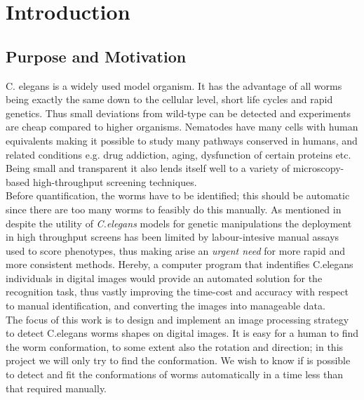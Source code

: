 \cleardoublepage
\thispagestyle{empty}
\chapter{Introduction}

\section{Purpose and Motivation}
\label{sec:motivation}


C. elegans is a widely used model organism. It has the advantage of all worms 
being exactly the same down to the cellular level, short life cycles and rapid
 genetics. Thus small deviations from wild-type can be detected and experiments
 are cheap compared to higher organisms. Nematodes have many cells with human
 equivalents making it possible to study many pathways conserved in humans, 
and related conditions e.g. drug addiction, aging, dysfunction of certain
 proteins etc. Being small and transparent it also lends itself well to a 
variety of microscopy-based high-throughput screening techniques.\\
 
Before quantification, the worms have to be identified; this should be 
automatic since there are too many worms to feasibly do this manually.
As mentioned in 
\cite{automated} despite the utility of \emph{C.elegans} models for genetic 
manipulations the deployment in high throughput screens has been limited by 
labour-intesive manual assays used to score phenotypes, thus making arise
an \emph{urgent need} for more rapid and more consistent methods.
Hereby, a computer
program that indentifies C.elegans individuals in digital images would 
provide an automated solution for the recognition task, thus vastly 
improving the time-cost and accuracy with respect to manual identification, 
and converting the images into manageable data.\\

The focus of this work is to design and implement an image processing
strategy to detect C.elegans worms shapes on digital images.
It is easy for a human to find the worm conformation,
to some extent also the rotation and direction; in this project we will only 
try to find the conformation. We wish to know if is possible to detect and fit
the conformations of worms automatically in a time less than that required manually.\\

